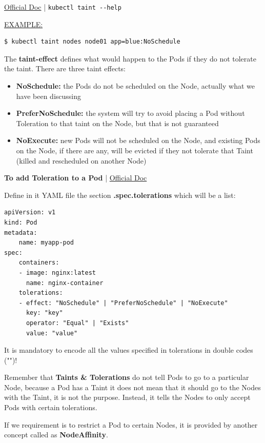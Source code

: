 \documentclass{article}
\newenvironment{blocktemplateII}[1]{%
    \tcolorbox[beamer,%
    noparskip,breakable,
    colframe=Green,%
    colbacklower=LimeGreen!75!LightGreen,%
    title=#1]}%
    {\endtcolorbox}
\newenvironment{blocktemplateIII}[1]{%
    \tcolorbox[beamer,%
    noparskip,breakable,
    ,colframe=Red,%
    colbacklower=LimeGreen!75!LightGreen,%
    title=#1]}%
    {\endtcolorbox}
\newenvironment{codetemplate}[1][]{%
  \mybasecolorbox[#1]
  \itshape
}{%
  \endmybasecolorbox
}
\begin{document}
\href{https://kubernetes.io/docs/concepts/scheduling-eviction/taint-and-toleration/}{Official Doc} | \verb|kubectl taint --help|

\underline{EXAMPLE:}
\begin{codetemplate}{}
\begin{verbatim}
$ kubectl taint nodes node01 app=blue:NoSchedule
\end{verbatim}
\end{codetemplate}

The \textbf{taint-effect} defines what would happen to the Pods if they do not tolerate the taint. There are three taint effects:

\begin{itemize}
    \item \textbf{NoSchedule:} the Pods do not be scheduled on the Node, actually what we have been discussing
    \item \textbf{PreferNoSchedule:} the system will try to avoid placing a Pod without Toleration to that taint on the Node, but that is not guaranteed
    \item \textbf{NoExecute:} new Pods will not be scheduled on the Node, and existing Pods on the Node, if there are any, will be evicted if they not tolerate that Taint (killed and rescheduled on another Node)
\end{itemize}

\textbf{To add Toleration to a Pod} | \href{https://kubernetes.io/docs/concepts/scheduling-eviction/taint-and-toleration/}{Official Doc}

Define in it YAML file the section \textbf{.spec.tolerations} which will be a list:

\label{NodeSelector}
\begin{codetemplate}{}
\begin{verbatim}
apiVersion: v1
kind: Pod
metadata:
    name: myapp-pod
spec:
    containers:
    - image: nginx:latest
      name: nginx-container
    tolerations:
    - effect: "NoSchedule" | "PreferNoSchedule" | "NoExecute"
      key: "key" 
      operator: "Equal" | "Exists"
      value: "value"
\end{verbatim}
\end{codetemplate}

\begin{blocktemplateIII}{WARNING}
It is mandatory to encode all the values specified in tolerations in double codes ("")!
\end{blocktemplateIII}

\begin{blocktemplateII}{NOTE 1}
Remember that \textbf{Taints \& Tolerations} do not tell Pods to go to a particular Node, because a Pod has a Taint it does not mean that it should go to the Nodes with the Taint, it is not the purpose. Instead, it tells the Nodes to only accept Pods with certain tolerations.

If we requirement is to restrict a Pod to certain Nodes, it is provided by another concept called as \textbf{NodeAffinity}.
\end{blocktemplateII}
\end{document}
